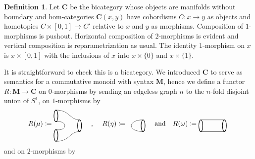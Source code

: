 \documentclass[11pt]{amsart}
\newcommand{\cat}[1]{\mathbf{#1}}
\renewcommand{\t}[1]{\textup{#1}}
\newcommand{\from}{\colon}
\theoremstyle{remark}
\theoremstyle{definition}
\newtheorem{defn}[thm]{Definition}
\begin{document}
\begin{defn}
	Let $\cat{C}$ be the bicategory whose objects are manifolds without boundary and hom-categories $\cat{C}(x,y)$ have cobordisms $C \from x \to y$ as objects and homotopies $C \times [0,1] \to C'$ relative to $x$ and $y$ as morphisms. Composition of $1$-morphisms is pushout.  Horizontal composition of $2$-morphisms is evident and vertical composition is reparametrization as usual. The identity $1$-morphism on $x$ is $x \times [0,1]$ with the inclusions of $x$ into $x \times \{ 0 \}$ and $x \times \{ 1 \}$.  
\end{defn}  

It is straightforward to check this is a bicategory. We introduced $\cat{C}$ to serve as semantics for a commutative monoid with syntax $\cat{M}$, hence we define a functor $R \from \cat{M} \to \cat{C}$ on $0$-morphisms by sending an edgeless graph $n$ to the $n$-fold disjoint union of $S^1$, on $1$-morphisms by 
\[
R(\mu) \coloneqq
\raisebox{-0.5\height}{%
	\begin{tikzpicture}
		\draw [thick]  (1.6,-0.2) ellipse (0.1 and 0.3);
	\draw [thick]  (0.4,0.3) ellipse (0.1 and 0.3);
	\draw [thick] (0.4,-0.7) ellipse (0.1 and 0.3);
	\draw (0.4,0) .. controls (1,0.1) and (1,-0.5) .. (0.4,-0.4);
	\draw (0.4,0.6) .. controls (1.1,0.6) and (1.1,0.1) .. (1.6,0.1);
	\draw (0.4,-1) .. controls (1.1,-1) and (1.1,-0.5) .. (1.6,-0.5);
	\end{tikzpicture}
}
	\quad
	\t{, }
	\quad
R(\eta) \coloneqq
\raisebox{-0.5\height}{%
	\begin{tikzpicture}
	\draw [thick]  (0,0) ellipse (0.1 and 0.3);
	\draw (0,0.3) .. controls (-0.8,0.3) and (-0.8,-0.3) .. (0,-0.3);
	\end{tikzpicture}
}
%
%
%
\quad
\t{and}
\quad
%
%
%
R(\omega) \coloneqq
\raisebox{-0.5\height}{%
	\begin{tikzpicture}
	\draw [thick]  (1.6,-0.2) ellipse (0.1 and 0.3);
	\draw [thick] (0.4,-0.2) ellipse (0.1 and 0.3);
	\draw (0.4,0.1) -- (1.6,0.1);
	\draw (0.4,-0.5) -- (1.6,-0.5);
	\end{tikzpicture}
}
\]
and on $2$-morphisms by 
\end{document}
